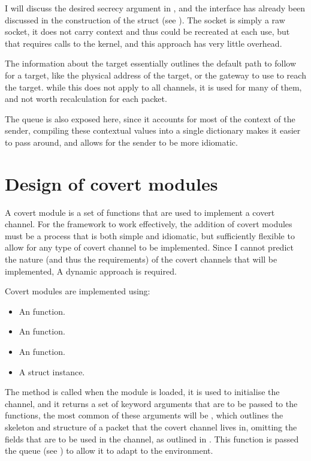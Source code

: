 I will discuss the desired secrecy argument in , and the interface has already been discussed in the construction of the  struct (see ). The socket is simply a raw socket, it does not carry context and thus could be recreated at each use, but that requires calls to the kernel, and this approach has very little overhead.

The information about the target essentially outlines the default path to follow for a target, like the physical address of the target, or the gateway to use to reach the target. while this does not apply to all channels, it is used for many of them, and not worth recalculation for each packet.

The queue is also exposed here, since it accounts for most of the context of the sender, compiling these contextual values into a single dictionary makes it easier to pass around, and allows for the sender to be more idiomatic.

\section{Design of covert modules}
\label{sec:covert_modules}

A covert module is a set of functions that are used to implement a covert channel. For the framework to work effectively, the addition of covert modules must be a process that is both simple and idiomatic, but sufficiently flexible to allow for any type of covert channel to be implemented. Since I cannot predict the nature (and thus the requirements) of the covert channels that will be implemented, A dynamic approach is required.

Covert modules are implemented using:
\begin{itemize}
    \item An  function.
    \item An  function.
    \item An  function.
    \item A  struct instance.
\end{itemize}

The  method is called when the module is loaded, it is used to initialise the channel, and it returns a set of keyword arguments that are to be passed to the  functions, the most common of these arguments will be , which outlines the skeleton and structure of a packet that the covert channel lives in, omitting the fields that are to be used in the channel, as outlined in . This function is passed the queue (see ) to allow it to adapt to the environment.

